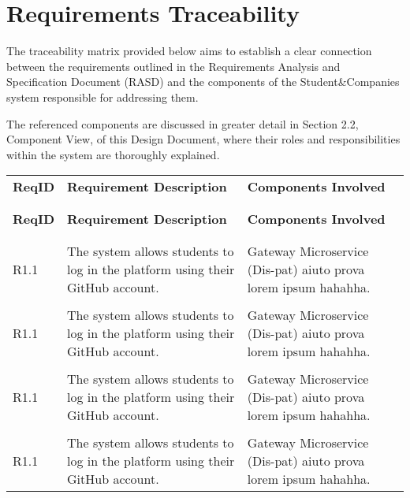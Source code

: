 \chapter{Requirements Traceability}

The traceability matrix provided below aims to establish a clear connection between the requirements outlined in the Requirements Analysis and Specification Document (RASD) and the components of the Student\&Companies system responsible for addressing them. 

The referenced components are discussed in greater detail in Section 2.2, Component View, of this Design Document, where their roles and responsibilities within the system are thoroughly explained.


\begin{longtable}{p{}p{}p{}}
    \textbf{ReqID} & \textbf{Requirement Description} & \textbf{Components Involved} \\
    \vspace{0.5em}\\
    \hline
    \vspace{0.5em}\\
    \endfirsthead
    \textbf{ReqID} & \textbf{Requirement Description} & \textbf{Components Involved} \\
    \vspace{0.5em}\\
    \hline
    \vspace{0.5em}\\
    \endhead

    R1.1 &
    The system allows students to log in the platform using their GitHub account. &
    Gateway Microservice (Dis-pat) aiuto prova lorem ipsum hahahha. \\
    \vspace{0.5em}\\
    R1.1 &
    The system allows students to log in the platform using their GitHub account. &
    Gateway Microservice (Dis-pat) aiuto prova lorem ipsum hahahha. \\
    \vspace{0.5em}\\
    R1.1 &
    The system allows students to log in the platform using their GitHub account. &
    Gateway Microservice (Dis-pat) aiuto prova lorem ipsum hahahha. \\
    \vspace{0.5em}\\
    R1.1 &
    The system allows students to log in the platform using their GitHub account. &
    Gateway Microservice (Dis-pat) aiuto prova lorem ipsum hahahha. \\

\end{longtable}
